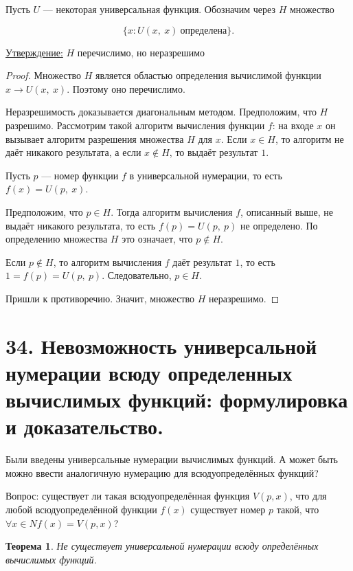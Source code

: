\documentclass[a4paper, 12pt]{article}
\newtheorem*{theorem}{Теорема}
\newcommand{\statement}{\underline{Утверждение:} }
\begin{document}
Пусть $U$ — некоторая универсальная функция. Обозначим через $H$ множество

\[
    \{x : U(x,\ x)\ \text{определена}\}.
\]

\statement{$H$ перечислимо, но неразрешимо}

\begin{proof}
Множество $H$ является областью определения вычислимой функции $x \to U(x,\ x)$. Поэтому оно перечислимо.
    
Неразрешимость доказывается диагональным методом. Предположим, что
$H$ разрешимо. Рассмотрим такой алгоритм вычисления функции $f$: на входе $x$ он
вызывает алгоритм разрешения множества $H$ для $x$. Если $x \in H$, то алгоритм не даёт никакого результата, а если $x \notin H$, то выдаёт результат $1$.

Пусть $p$ — номер функции $f$ в универсальной нумерации, то есть $f(x) = U(p,\ x)$.

Предположим, что $p \in H$. Тогда алгоритм вычисления $f$, описанный выше, не
выдаёт никакого результата, то есть $f(p) = U(p,\ p)$ не определено. По определению множества $H$ это означает, что $p \notin H$.

Если $p \notin H$, то алгоритм вычисления $f$ даёт результат $1$, то есть $1 = f(p) = U(p,\ p)$. Следовательно, $p \in H$.

Пришли к противоречию. Значит, множество $H$ неразрешимо.

\end{proof}

\section*{34. Невозможность универсальной нумерации всюду определенных вычислимых функций: формулировка и доказательство.}

    Были введены универсальные нумерации вычислимых
    функций. А может быть можно ввести аналогичную
    нумерацию для всюдуопределённых функций?
    
    Вопрос: существует ли такая всюдуопределённая
    функция $V(p, x)$, что для любой всюдуопределённой
    функции $f(x)$ существует номер $p$ такой, что
    $\forall x \in N f(x) = V(p, x)$?

\begin{theorem}
    Не существует универсальной нумерации всюду определённых вычислимых функций.
\end{theorem}
\end{document}
